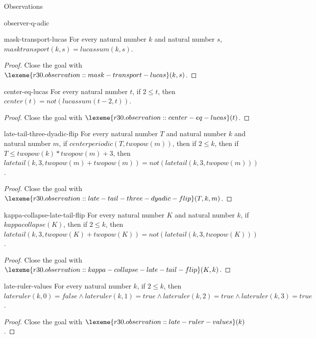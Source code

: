 \begin{lexlean}{Observations}
\begin{section}{observer-q-adic}
\begin{theorem}{mask-transport-lucas}
For every natural number \(k\) and natural number \(s\), \(masktransport(k, s) = lucassum(k, s)\).
\begin{proof}
Close the goal with \(\lexeme{r30.observation::mask-transport-lucas}(k, s)\).
\end{proof}
\end{theorem}

\begin{theorem}{center-eq-lucas}
For every natural number \(t\), if \(2 ≤ t\), then \(center(t) = not(lucassum(t - 2, t))\).
\begin{proof}
Close the goal with \(\lexeme{r30.observation::center-eq-lucas}(t)\).
\end{proof}
\end{theorem}

\begin{theorem}{late-tail-three-dyadic-flip}
For every natural number \(T\) and natural number \(k\) and natural number \(m\), if \(centerperiodic(T, twopow(m))\), then if \(2 ≤ k\), then if \(T ≤ twopow(k) * twopow(m) + 3\), then \(latetail(k, 3, twopow(m) + twopow(m)) = not(latetail(k, 3, twopow(m)))\).
\begin{proof}
Close the goal with \(\lexeme{r30.observation::late-tail-three-dyadic-flip}(T, k, m)\).
\end{proof}
\end{theorem}

\begin{theorem}{kappa-collapse-late-tail-flip}
For every natural number \(K\) and natural number \(k\), if \(kappacollapse(K)\), then if \(2 ≤ k\), then \(latetail(k, 3, twopow(K) + twopow(K)) = not(latetail(k, 3, twopow(K)))\).
\begin{proof}
Close the goal with \(\lexeme{r30.observation::kappa-collapse-late-tail-flip}(K, k)\).
\end{proof}
\end{theorem}

\begin{theorem}{late-ruler-values}
For every natural number \(k\), if \(2 ≤ k\), then \(lateruler(k, 0) = false ∧ lateruler(k, 1) = true ∧ lateruler(k, 2) = true ∧ lateruler(k, 3) = true\).
\begin{proof}
Close the goal with \(\lexeme{r30.observation::late-ruler-values}(k)\).
\end{proof}
\end{theorem}


\end{section}
\end{lexlean}
